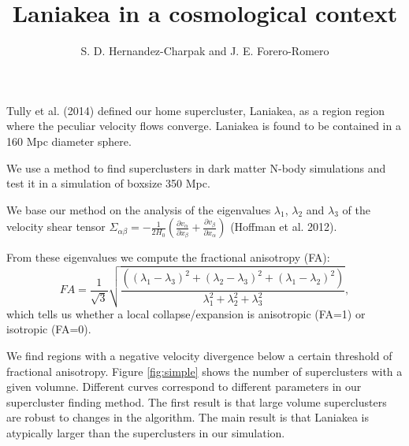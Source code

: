 \documentclass[preprint,proceedings]{rmaa}
\title{Laniakea in a cosmological context}
\author{S. D. Hernandez-Charpak\altaffilmark{1} and
    J. E. Forero-Romero\altaffilmark{1}}
\begin{document}
\maketitle 



Tully et al. (2014) defined our home supercluster, Laniakea, as a region
region where the peculiar velocity flows converge. Laniakea is found
to be contained in a 160 Mpc diameter sphere.

We use a method to find superclusters in dark matter N-body
simulations and test it in a simulation of boxsize 350 Mpc. 

We base our method on the analysis of the eigenvalues $\lambda_1$,
$\lambda_2$ and  $\lambda_3$ of the velocity shear tensor $\Sigma _{\alpha\beta} = -\frac{1}{2 H_0} \left( \frac{\partial v_{\alpha}}{\partial
  x_{\beta}} + \frac{\partial v_{\beta}}{\partial x_{\alpha}}
\right)$ (Hoffman et al. 2012).

From these eigenvalues we compute the fractional anisotropy
(FA):
\begin{equation}
  \label{eq:njump}
   FA = \frac{1}{\sqrt{3}} \sqrt{\frac{( \left( \lambda_1 - \lambda_3 \right)^2 +
   \left( \lambda_2 - \lambda_3 \right)^2 + \left( \lambda_1 - \lambda_2 \right)^2 
   )}{\lambda^{2}_1 + \lambda^{2}_2 + \lambda^{2}_3}},
\end{equation}
which tells us whether a local collapse/expansion is anisotropic (FA=1) or
isotropic (FA=0).

We find regions with a negative velocity divergence below a
certain threshold of fractional anisotropy.
Figure
\ref{fig:simple} shows the number of superclusters with a given volumne.
Different curves correspond to different parameters in our
supercluster finding method. The first result is that large volume
superclusters are robust to changes in the algorithm.
The main result is that Laniakea is atypically larger than the
superclusters in our simulation. 
\end{document}
